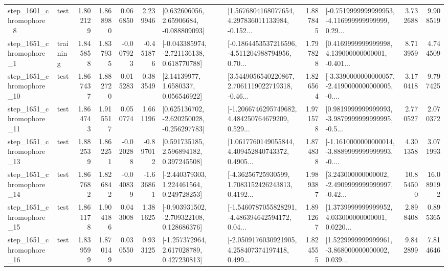 \begin{tabular}{llrrrrllrlrr}
  step\_1601\_chromophore\_8 &      test &      1.802129 &    1.868980 &      0.066850 &  2.239946 &     [0.632606056, 2.65906684, -0.088809093] &  [1.5676804168077654, 4.297836011133984, -0.152... &       1.887845 &  [-0.7519999999999953, -4.116999999999999, 0.29... &            3.732688 &          9.908519 \\
  step\_1651\_chromophore\_1 &  training &      1.845858 &    1.837935 &     -0.007923 & -0.451876 &   [-0.043385974, -2.721136138, 0.618770788] &  [-0.1864453537216596, -4.511204988794956, 0.70... &       1.797828 &  [0.4169999999999998, 4.139000000000001, -0.401... &            8.713959 &          4.744509 \\
 step\_1651\_chromophore\_10 &      test &      1.867437 &    1.882720 &      0.015283 &  0.383549 &        [2.14139977, 1.6580337, 0.056546922] &  [3.5449056540220867, 2.7061119022719318, -0.46... &       1.826564 &  [-3.3390000000000057, -2.4190000000000005, -0.... &            3.170418 &          9.797425 \\
 step\_1651\_chromophore\_11 &      test &      1.864743 &    1.915517 &      0.050774 &  1.661196 &   [0.625136702, -2.620250028, -0.256297783] &  [-1.2066746295749682, 4.484250764679209, 0.529... &       1.971578 &  [0.9819999999999993, -3.9879999999999995, -0.5... &            2.770527 &          2.070372 \\
 step\_1651\_chromophore\_13 &      test &      1.882539 &    1.862251 &     -0.020288 & -0.897012 &     [0.591735185, 2.596894182, 0.397245508] &  [1.0617760149055844, 4.409452840743372, 0.4905... &       1.874838 &  [-1.1610000000000014, -3.8889999999999993, -0.... &            4.301358 &          3.071993 \\
 step\_1651\_chromophore\_14 &      test &      1.867682 &    1.826842 &     -0.040839 & -1.636861 &    [-2.440379303, 1.224461564, 0.249728253] &  [-4.36256725930599, 1.7083152426243813, 0.4192... &       1.989387 &  [3.243000000000002, -2.4909999999999997, -0.42... &           10.854500 &         16.089192 \\
 step\_1651\_chromophore\_15 &      test &      1.861178 &    1.904186 &      0.043008 &  1.381625 &   [-0.903931502, -2.709322108, 0.128686376] &  [-1.5460787055828291, -4.486394642594172, 0.04... &       1.891267 &  [1.3739999999999952, 4.033000000000001, 0.0220... &            2.898408 &          0.895365 \\
 step\_1651\_chromophore\_16 &      test &      1.839599 &    1.870149 &      0.030550 &  0.933125 &    [-1.257372964, 2.617028789, 0.427230813] &  [-2.0509176030921905, 4.258407374197418, 0.499... &       1.824555 &  [1.5229999999999961, -3.868000000000002, 0.039... &            9.842899 &          7.814646 \\

\end{tabular}
